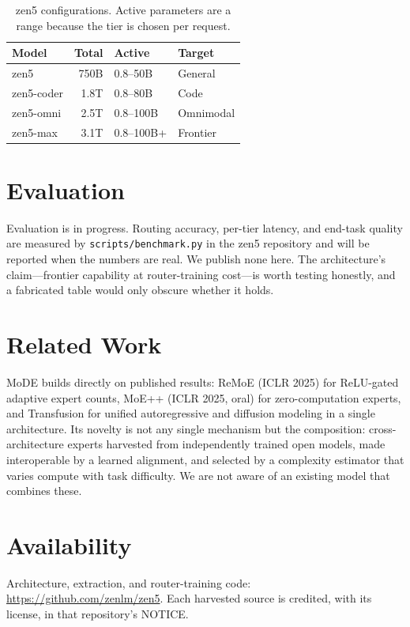 \documentclass[11pt,a4paper]{article}
\begin{document}
\begin{table}[H]
\centering
\caption{zen5 configurations. Active parameters are a range because the tier is chosen per request.}
\begin{tabular}{lrll}
\toprule
\textbf{Model} & \textbf{Total} & \textbf{Active} & \textbf{Target} \\
\midrule
zen5       & 750B & 0.8--50B   & General \\
zen5-coder & 1.8T & 0.8--80B   & Code \\
zen5-omni  & 2.5T & 0.8--100B  & Omnimodal \\
zen5-max   & 3.1T & 0.8--100B+ & Frontier \\
\bottomrule
\end{tabular}
\end{table}

\section{Evaluation}

Evaluation is in progress. Routing accuracy, per-tier latency, and end-task quality are
measured by \texttt{scripts/benchmark.py} in the zen5 repository and will be reported
when the numbers are real. We publish none here. The architecture's claim---frontier
capability at router-training cost---is worth testing honestly, and a fabricated table
would only obscure whether it holds.

\section{Related Work}

MoDE builds directly on published results: ReMoE (ICLR 2025) for ReLU-gated adaptive
expert counts, MoE++ (ICLR 2025, oral) for zero-computation experts, and Transfusion for
unified autoregressive and diffusion modeling in a single architecture. Its novelty is
not any single mechanism but the composition: cross-architecture experts harvested from
independently trained open models, made interoperable by a learned alignment, and
selected by a complexity estimator that varies compute with task difficulty. We are not
aware of an existing model that combines these.

\section*{Availability}

Architecture, extraction, and router-training code: \url{https://github.com/zenlm/zen5}.
Each harvested source is credited, with its license, in that repository's NOTICE.
\end{document}
